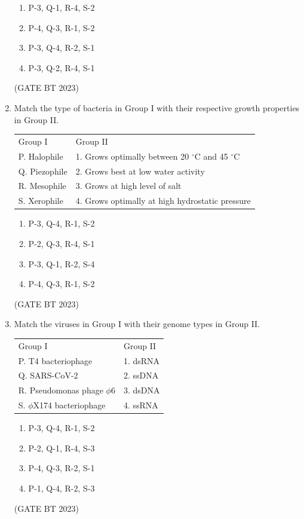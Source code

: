 \documentclass[journal,12pt,onecolumn]{IEEEtran}
\begin{document}
\begin{enumerate}
    \begin{enumerate}
        \item P-3, Q-1, R-4, S-2
        \item P-4, Q-3, R-1, S-2
        \item P-3, Q-4, R-2, S-1
        \item P-3, Q-2, R-4, S-1
    \end{enumerate}
    \hfill(GATE BT 2023)

    \item Match the type of bacteria in Group I with their respective growth properties in Group II.
    
    \begin{tabular}{ll}
        Group I & Group II \\
        P. Halophile & 1. Grows optimally between 20 $^\circ$C and 45 $^\circ$C \\
        Q. Piezophile & 2. Grows best at low water activity \\
        R. Mesophile & 3. Grows at high level of salt \\
        S. Xerophile & 4. Grows optimally at high hydrostatic pressure \\
    \end{tabular}
    
    \begin{enumerate}
        \item P-3, Q-4, R-1, S-2
        \item P-2, Q-3, R-4, S-1
        \item P-3, Q-1, R-2, S-4
        \item P-4, Q-3, R-1, S-2
    \end{enumerate}
    \hfill(GATE BT 2023)

    \item Match the viruses in Group I with their genome types in Group II.
    
    \begin{tabular}{ll}
        Group I & Group II \\
        P. T4 bacteriophage & 1. dsRNA \\
        Q. SARS-CoV-2 & 2. ssDNA \\
        R. Pseudomonas phage $\phi$6 & 3. dsDNA \\
        S. $\phi$X174 bacteriophage & 4. ssRNA \\
    \end{tabular}
    
    \begin{enumerate}
        \item P-3, Q-4, R-1, S-2
        \item P-2, Q-1, R-4, S-3
        \item P-4, Q-3, R-2, S-1
        \item P-1, Q-4, R-2, S-3
    \end{enumerate}
    \hfill(GATE BT 2023)


\end{enumerate}
\end{document}

